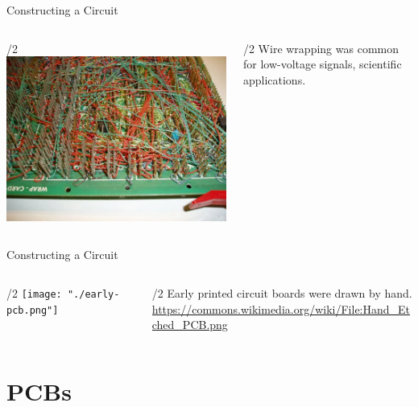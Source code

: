\documentclass{presentation}
\begin{document}
\begin{frame}{Constructing a Circuit}
  \begin{columns}
    \begin{column}{\textwidth/2}
      \includegraphics[width=\textwidth]{"./wirewrap.png"}
    \end{column}
    \begin{column}{\textwidth/2}
      Wire wrapping was common for low-voltage signals, scientific applications.
    \end{column}
  \end{columns}
\end{frame}

\begin{frame}{Constructing a Circuit}
  \begin{columns}
    \begin{column}{\textwidth/2}
      \texttt{[image: "./early-pcb.png"]}
    \end{column}
    \begin{column}{\textwidth/2}
      Early printed circuit boards were drawn by hand. \\
      \vfill
      \url{https://commons.wikimedia.org/wiki/File:Hand_Etched_PCB.png}
    \end{column}
  \end{columns}
\end{frame}

\section{PCBs}
\end{document}
